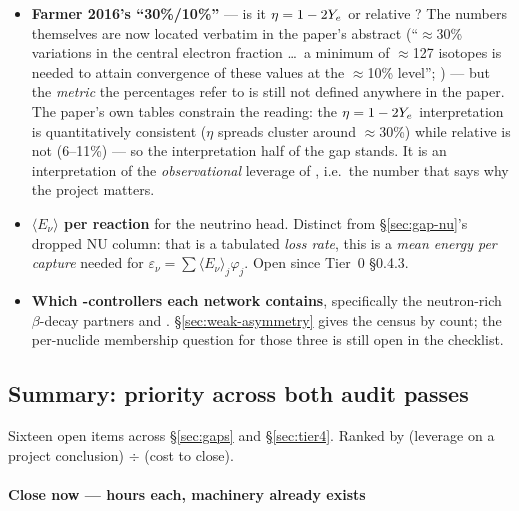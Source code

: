\begin{itemize}
\item \textbf{Farmer 2016's ``30\%/10\%''} --- is it $\eta = 1-2Y_{e}$ or relative
      \Ye? The numbers themselves are now located verbatim in the paper's
      abstract (``$\approx$30\% variations in the central electron fraction
      \ldots\ a minimum of $\approx$127 isotopes is needed to attain convergence
      of these values at the $\approx$10\% level''; \citealp{farmer2016}) ---
      but the \emph{metric} the percentages refer to is still not defined
      anywhere in the paper. The paper's own tables constrain the reading: the
      $\eta = 1-2Y_{e}$ interpretation is quantitatively consistent ($\eta$
      spreads cluster around $\approx$30\%) while relative \Ye{} is not
      (6--11\%) --- so the interpretation half of the gap stands. It is an
      interpretation of the \emph{observational} leverage of \Ye, i.e.\ the
      number that says why the project matters.
\item \textbf{$\langle E_\nu\rangle$ per reaction} for the neutrino head.
      Distinct from \S\ref{sec:gap-nu}'s dropped NU column: that is a tabulated
      \emph{loss rate}, this is a \emph{mean energy per capture} needed for
      $\varepsilon_\nu = \sum\langle E_\nu\rangle_j\varphi_j$. Open since
      Tier~0 \S0.4.3.
\item \textbf{Which \Ye-controllers each network contains}, specifically the
      neutron-rich $\beta$-decay partners  and .
      \S\ref{sec:weak-asymmetry} gives the census by count; the per-nuclide
      membership question for those three is still open in the checklist.
\end{itemize}

\subsection{Summary: priority across both audit passes}
\label{sec:priority}

Sixteen open items across \S\ref{sec:gaps} and \S\ref{sec:tier4}. Ranked by
(leverage on a project conclusion) $\div$ (cost to close).

\paragraph{Close now --- hours each, machinery already exists}

